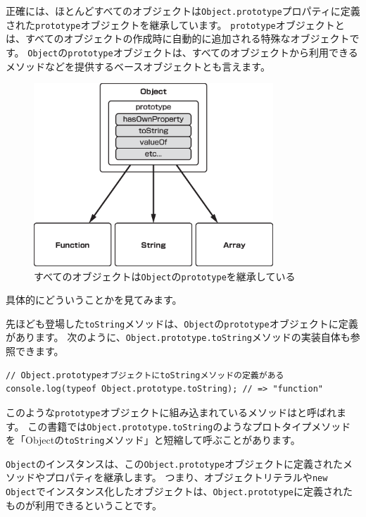 正確には、ほとんどすべてのオブジェクトは\texttt{Object.prototype}プロパティに定義された\texttt{prototype}オブジェクトを継承しています。
\texttt{prototype}オブジェクトとは、すべてのオブジェクトの作成時に自動的に追加される特殊なオブジェクトです。
\texttt{Object}の\texttt{prototype}オブジェクトは、すべてのオブジェクトから利用できるメソッドなどを提供するベースオブジェクトとも言えます。
\newpage
\begin{figure}[h]
\centering
\includegraphics[width=90mm]{./fig/object-prototype.eps}
\caption{すべてのオブジェクトは\texttt{Object}の\texttt{prototype}を継承している}
\end{figure}

具体的にどういうことかを見てみます。

先ほども登場した\texttt{toString}メソッドは、\texttt{Object}の\texttt{prototype}オブジェクトに定義があります。
次のように、\texttt{Object.prototype.toString}メソッドの実装自体も参照できます。

\begin{lstlisting}
// Object.prototypeオブジェクトにtoStringメソッドの定義がある
console.log(typeof Object.prototype.toString); // => "function"
\end{lstlisting}

このような\texttt{prototype}オブジェクトに組み込まれているメソッドは\textbf{}と呼ばれます。
この書籍では\texttt{Object.prototype.toString}のようなプロトタイプメソッドを「Objectの\texttt{toString}メソッド」と短縮して呼ぶことがあります。

\texttt{Object}のインスタンスは、この\texttt{Object.prototype}オブジェクトに定義されたメソッドやプロパティを継承します。
つまり、オブジェクトリテラルや\texttt{new Object}でインスタンス化したオブジェクトは、\texttt{Object.prototype}に定義されたものが利用できるということです。


